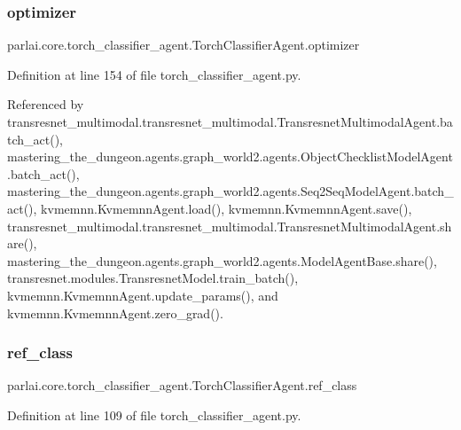 \subsubsection{\texorpdfstring{optimizer}{optimizer}}
{\footnotesize\ttfamily parlai.\+core.\+torch\+\_\+classifier\+\_\+agent.\+Torch\+Classifier\+Agent.\+optimizer}



Definition at line 154 of file torch\+\_\+classifier\+\_\+agent.\+py.



Referenced by transresnet\+\_\+multimodal.\+transresnet\+\_\+multimodal.\+Transresnet\+Multimodal\+Agent.\+batch\+\_\+act(), mastering\+\_\+the\+\_\+dungeon.\+agents.\+graph\+\_\+world2.\+agents.\+Object\+Checklist\+Model\+Agent.\+batch\+\_\+act(), mastering\+\_\+the\+\_\+dungeon.\+agents.\+graph\+\_\+world2.\+agents.\+Seq2\+Seq\+Model\+Agent.\+batch\+\_\+act(), kvmemnn.\+Kvmemnn\+Agent.\+load(), kvmemnn.\+Kvmemnn\+Agent.\+save(), transresnet\+\_\+multimodal.\+transresnet\+\_\+multimodal.\+Transresnet\+Multimodal\+Agent.\+share(), mastering\+\_\+the\+\_\+dungeon.\+agents.\+graph\+\_\+world2.\+agents.\+Model\+Agent\+Base.\+share(), transresnet.\+modules.\+Transresnet\+Model.\+train\+\_\+batch(), kvmemnn.\+Kvmemnn\+Agent.\+update\+\_\+params(), and kvmemnn.\+Kvmemnn\+Agent.\+zero\+\_\+grad().

\mbox{\label{classparlai_1_1core_1_1torch__classifier__agent_1_1TorchClassifierAgent_a830ed9662779e824cc9596695b04e985}} 
\subsubsection{\texorpdfstring{ref\+\_\+class}{ref\_class}}
{\footnotesize\ttfamily parlai.\+core.\+torch\+\_\+classifier\+\_\+agent.\+Torch\+Classifier\+Agent.\+ref\+\_\+class}



Definition at line 109 of file torch\+\_\+classifier\+\_\+agent.\+py.



